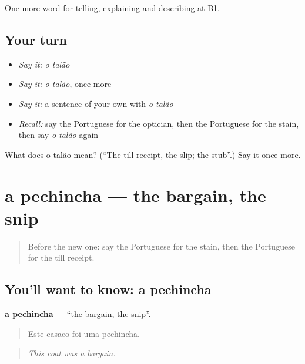 \begin{grammarlens}[title={What you've built}]
One more word for telling, explaining and describing at B1.
\end{grammarlens}

\subsection*{Your turn}
\begin{itemize}
\raggedright
  \item \emph{Say it:} \emph{o talão}
  \item \emph{Say it:} \emph{o talão}, once more
  \item \emph{Say it:} a sentence of your own with \emph{o talão}
  \item \emph{Recall:} say the Portuguese for the optician, then the Portuguese for the stain, then say \emph{o talão} again
\end{itemize}

\begin{tcolorbox}[breakable,colback=teal!4,colframe=teal!35!black,title={Before you move on}]
What does o talão mean? (\textquotedblleft{}The till receipt, the slip; the stub\textquotedblright{}.) Say it once more.
\end{tcolorbox}
\section[a pechincha]{a pechincha — the bargain, the snip}

\label{lesson:PT-C453-pechincha}



\begin{quote}
Before the new one: say the Portuguese for the stain, then the Portuguese for the till receipt.
\end{quote}

\subsection*{You'll want to know: a pechincha}
\textbf{a pechincha} — \textquotedblleft{}the bargain, the snip\textquotedblright{}.

\begin{quote}
Este casaco foi uma pechincha.
\end{quote}

\begin{quote}
\emph{This coat was a bargain.}
\end{quote}

